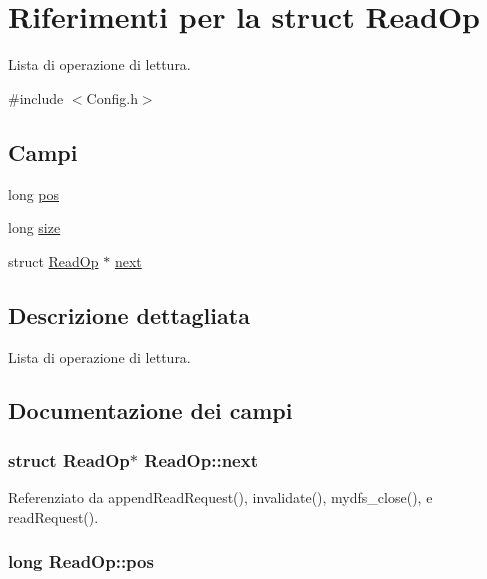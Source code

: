 \hypertarget{structReadOp}{}\section{Riferimenti per la struct Read\+Op}
\label{structReadOp}


Lista di operazione di lettura.  




{\ttfamily \#include $<$Config.\+h$>$}

\subsection*{Campi}
\begin{DoxyCompactItemize}
\item 
long \hyperlink{structReadOp_a5659a814b4b0696cc017d5ea088eb2c1}{pos}
\item 
long \hyperlink{structReadOp_a2562187098302a2641f29f89e77748b0}{size}
\item 
struct \hyperlink{structReadOp}{Read\+Op} $\ast$ \hyperlink{structReadOp_ac84186a2d784cb2fbd0c71dd7d5df78d}{next}
\end{DoxyCompactItemize}


\subsection{Descrizione dettagliata}
Lista di operazione di lettura. 

\subsection{Documentazione dei campi}
\subsubsection[{\texorpdfstring{next}{next}}]{\setlength{\rightskip}{0pt plus 5cm}struct {\bf Read\+Op}$\ast$ Read\+Op\+::next}\hypertarget{structReadOp_ac84186a2d784cb2fbd0c71dd7d5df78d}{}\label{structReadOp_ac84186a2d784cb2fbd0c71dd7d5df78d}


Referenziato da append\+Read\+Request(), invalidate(), mydfs\+\_\+close(), e read\+Request().

\subsubsection[{\texorpdfstring{pos}{pos}}]{\setlength{\rightskip}{0pt plus 5cm}long Read\+Op\+::pos}\hypertarget{structReadOp_a5659a814b4b0696cc017d5ea088eb2c1}{}\label{structReadOp_a5659a814b4b0696cc017d5ea088eb2c1}


